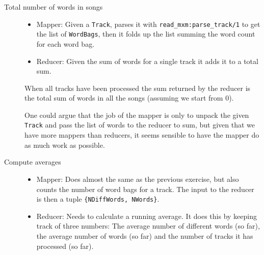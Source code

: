 \documentclass[a4paper]{article}
\begin{document}
\begin{description}
\begin{itemize}
  \end{itemize}
\item[Total number of words in songs]\hfill
  \begin{itemize}
  \item Mapper: Given a \texttt{Track}, parses it with \texttt{read\_mxm:parse\_track/1} to get the list of \texttt{WordBags}, then it folds up the list summing the word count for each word bag.
  \item Reducer: Given the sum of words for a single track it adds it to a total sum.
  \end{itemize}
  When all tracks have been processed the sum returned by the reducer is the total sum of words in all the songs (assuming we start from $0$).

  One could argue that the job of the mapper is only to unpack the given \texttt{Track} and pass the list of words to the reducer to sum, but given that we have more mappers than reducers, it seems sensible to have the mapper do as much work as possible.
\item[Compute averages]\hfill
  \begin{itemize}
  \item Mapper: Does almost the same as the previous exercise, but also counts the number of word bags for a track. The input to the reducer is then a tuple \texttt{\{NDiffWords, NWords\}}.
  \item Reducer: Needs to calculate a running average. It does this by keeping track of three numbers: The average number of different words (so far), the average number of words (so far) and the number of tracks it has processed (so far).


\end{itemize}
\end{description}
\end{document}
